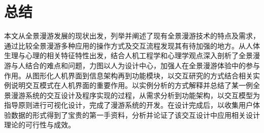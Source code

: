 \chapter{总结}
本文从全景漫游发展的现状出发，列举并阐述了现有全景漫游技术的特点及需求，通过比较全景漫游多种应用的操作方式及交互流程发现其有待加强的地方。从人体生理与心理的相关特征特性出发，结合人机工程学和心理学观点深入剖析了全景漫游与人结合的难点和问题，力图以人为设计中心，加强人在全景漫游体验中的参与作用。从图形化人机界面到信息架构再到功能模块，以交互研究的方式结合相关实例说明交互模式在人机界面的重要作用。以实例分析的方式解释并总结了某一例全景漫游系统的交互设计及程序实现的过程，从需求分析到功能架构，以交互模型为指导原则进行可视化设计，完成了漫游系统的开发。在设计完成后，以收集用户体验数据的形式得到了宝贵的第一手资料，分析并论证了该交互设计中应用相关设计理论的可行性与成效。
